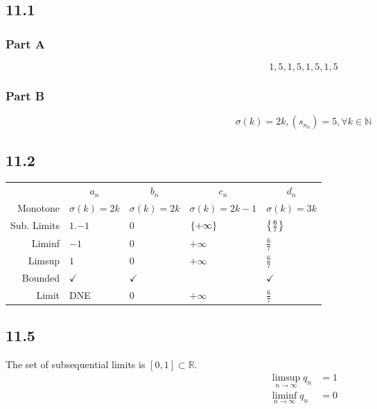 \documentclass[12pt,titlepage]{extarticle}
\begin{document}
\subsection*{11.1}
\subsubsection*{Part A}
\[
    1, 5, 1, 5, 1, 5, 1, 5
\]
\subsubsection*{Part B}
\[
    \sigma(k) = 2k, (s_{n_k}) = 5, \forall k \in \mathbb{N}
\]


\subsection*{11.2}
\begin{table}[h!]
    \def\arraystretch{1.5}
    \centering
    \begin{tabular}{rllll}
                & \multicolumn{1}{c}{$a_n$} & \multicolumn{1}{c}{$b_n$} & \multicolumn{1}{c}{$c_n$} & \multicolumn{1}{c}{$d_n$} \\
    Monotone    & $\sigma(k) = 2k$          & $\sigma(k) = 2k$          & $\sigma(k) = 2k - 1$      & $\sigma(k) = 3k$          \\
    Sub. Limits & $\qty{1, -1}$             & $\qty{0}$                 & $\qty{+\infty}$           & $\qty{\frac{6}{7}}$       \\
    Liminf  & $-1$         & $0$          & $+\infty$ & $\frac{6}{7}$ \\
    Limsup  & $1$          & $0$          & $+\infty$ & $\frac{6}{7}$ \\
    Bounded & $\checkmark$ & $\checkmark$ &           & $\checkmark$  \\
    Limit   & DNE          & $0$          & $+\infty$ & $\frac{6}{7}$
    \end{tabular}
\end{table}

\subsection*{11.5}
The set of subsequential limits is $[0,1] \subset \mathbb{R}$.
\begin{align*}
    \limsup_{n \to \infty} q_n &= 1 \\
    \liminf_{n \to \infty} q_n &= 0 \\
\end{align*}
\end{document}
